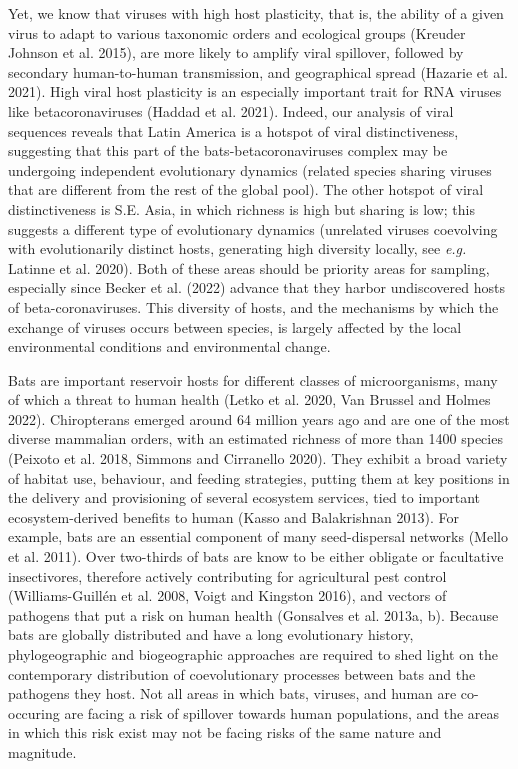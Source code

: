 \documentclass[11pt]{article}
\begin{document}
Yet, we know that viruses with high host plasticity, that is, the
ability of a given virus to adapt to various taxonomic orders and
ecological groups (Kreuder Johnson et al. 2015), are more likely to
amplify viral spillover, followed by secondary human-to-human
transmission, and geographical spread (Hazarie et al. 2021). High viral
host plasticity is an especially important trait for RNA viruses like
betacoronaviruses (Haddad et al. 2021). Indeed, our analysis of viral
sequences reveals that Latin America is a hotspot of viral
distinctiveness, suggesting that this part of the bats-betacoronaviruses
complex may be undergoing independent evolutionary dynamics (related
species sharing viruses that are different from the rest of the global
pool). The other hotspot of viral distinctiveness is S.E. Asia, in which
richness is high but sharing is low; this suggests a different type of
evolutionary dynamics (unrelated viruses coevolving with evolutionarily
distinct hosts, generating high diversity locally, see \emph{e.g.}
Latinne et al. 2020). Both of these areas should be priority areas for
sampling, especially since Becker et al. (2022) advance that they harbor
undiscovered hosts of beta-coronaviruses. This diversity of hosts, and
the mechanisms by which the exchange of viruses occurs between species,
is largely affected by the local environmental conditions and
environmental change.

Bats are important reservoir hosts for different classes of
microorganisms, many of which a threat to human health (Letko et al.
2020, Van Brussel and Holmes 2022). Chiropterans emerged around 64
million years ago and are one of the most diverse mammalian orders, with
an estimated richness of more than 1400 species (Peixoto et al. 2018,
Simmons and Cirranello 2020). They exhibit a broad variety of habitat
use, behaviour, and feeding strategies, putting them at key positions in
the delivery and provisioning of several ecosystem services, tied to
important ecosystem-derived benefits to human (Kasso and Balakrishnan
2013). For example, bats are an essential component of many
seed-dispersal networks (Mello et al. 2011). Over two-thirds of bats are
know to be either obligate or facultative insectivores, therefore
actively contributing for agricultural pest control (Williams-Guillén et
al. 2008, Voigt and Kingston 2016), and vectors of pathogens that put a
risk on human health (Gonsalves et al. 2013a, b). Because bats are
globally distributed and have a long evolutionary history,
phylogeographic and biogeographic approaches are required to shed light
on the contemporary distribution of coevolutionary processes between
bats and the pathogens they host. Not all areas in which bats, viruses,
and human are co-occuring are facing a risk of spillover towards human
populations, and the areas in which this risk exist may not be facing
risks of the same nature and magnitude.
\end{document}
